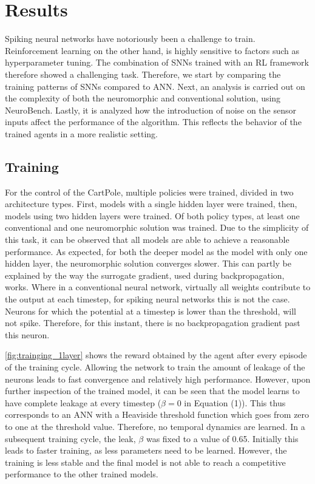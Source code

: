 \section{Results}
\label{section:results}
Spiking neural networks have notoriously been a challenge to train. Reinforcement learning on the other hand, is highly sensitive to factors such as hyperparameter tuning. The combination of SNNs trained with an RL framework therefore showed a challenging task. Therefore, we start by comparing the training patterns of SNNs compared to ANN. Next, an analysis is carried out on the complexity of both the neuromorphic and conventional solution, using NeuroBench. Lastly, it is analyzed how the introduction of noise on the sensor inputs affect the performance of the algorithm. This reflects the behavior of the trained agents in a more realistic setting. 
\\
\subsection{Training}
For the control of the CartPole, multiple policies were trained, divided in two architecture types. First, models with a single hidden layer were trained, then, models using two hidden layers were trained. Of both policy types, at least one conventional and one neuromorphic solution was trained. Due to the simplicity of this task, it can be observed that all models are able to achieve a reasonable performance. As expected, for both the deeper model as the model with only one hidden layer, the neuromorphic solution converges slower. This can partly be explained by the way the surrogate gradient, used during backpropagation, works. Where in a conventional neural network, virtually all weights contribute to the output at each timestep, for spiking neural networks this is not the case. Neurons for which the potential at a timestep is lower than the threshold, will not spike. Therefore, for this instant, there is no backpropagation gradient past this neuron.

\autoref{fig:trainging_1layer} shows the reward obtained by the agent after every episode of the training cycle. Allowing the network to train the amount of leakage of the neurons leads to fast convergence and relatively high performance. However, upon further inspection of the trained model, it can be seen that the model learns to have complete leakage at every timestep ($\beta=0$ in Equation (1)). This thus corresponds to an ANN with a Heaviside threshold function which goes from zero to one at the threshold value. Therefore, no temporal dynamics are learned. In a subsequent training cycle, the leak, $\beta$ was fixed to a value of 0.65. Initially this leads to faster training, as less parameters need to be learned. However, the training is less stable and the final model is not able to reach a competitive performance to the other trained models. 

